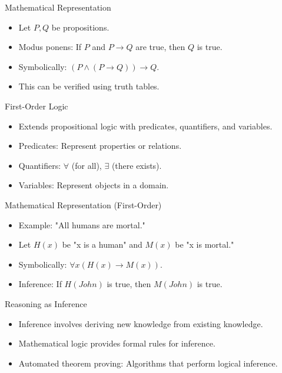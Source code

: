 \begin{frame}{Mathematical Representation}
  \begin{itemize}
    \item Let $P, Q$ be propositions.
    \item Modus ponens: If $P$ and $P \rightarrow Q$ are true, then $Q$ is true.
    \item Symbolically: $(P \wedge (P \rightarrow Q)) \rightarrow Q$.
    \item This can be verified using truth tables.
  \end{itemize}
\end{frame}

\begin{frame}{First-Order Logic}
  \begin{itemize}
    \item Extends propositional logic with predicates, quantifiers, and variables.
    \item Predicates: Represent properties or relations.
    \item Quantifiers: $\forall$ (for all), $\exists$ (there exists).
    \item Variables: Represent objects in a domain.
  \end{itemize}
\end{frame}

\begin{frame}{Mathematical Representation (First-Order)}
  \begin{itemize}
    \item Example: "All humans are mortal."
    \item Let $H(x)$ be "x is a human" and $M(x)$ be "x is mortal."
    \item Symbolically: $\forall x (H(x) \rightarrow M(x))$.
    \item Inference: If $H(John)$ is true, then $M(John)$ is true.
  \end{itemize}
\end{frame}

\begin{frame}{Reasoning as Inference}
    \begin{itemize}
        \item Inference involves deriving new knowledge from existing knowledge.
        \item Mathematical logic provides formal rules for inference.
        \item Automated theorem proving: Algorithms that perform logical inference.
    \end{itemize}
\end{frame}

